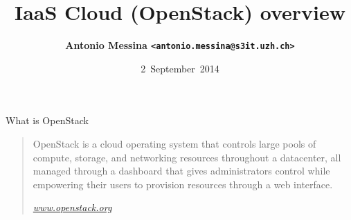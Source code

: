 \documentclass[english,serif,mathserif,usenames,dvipsnames]{beamer}
\begin{document}
\title[IaaS (OpenStack) overview]{IaaS Cloud (OpenStack) overview}

\author{%
  {\bfseries Antonio Messina \texttt{<antonio.messina@s3it.uzh.ch>}}  
}

\date{2~September~2014}

\maketitle

\begin{frame}
  {What is OpenStack}

  \begin{quote}
    OpenStack is a cloud operating system that controls large pools of
    compute, storage, and networking resources throughout a
    datacenter, all managed through a dashboard that gives
    administrators control while empowering their users to provision
    resources through a web interface.

    \hfill{\em \url{www.openstack.org}}
  \end{quote}
\end{frame}



\end{document}
